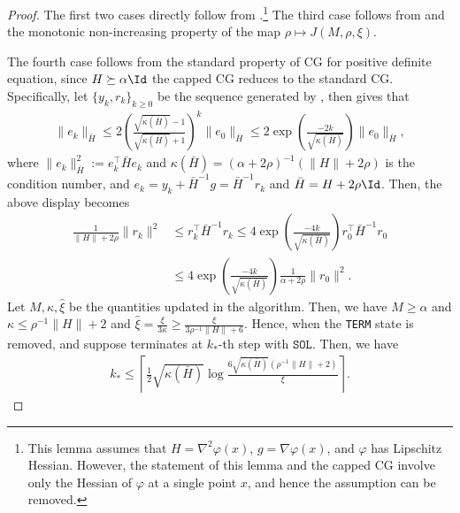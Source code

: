 \begin{proof}
    The first two cases directly follow from \citet[Lemma 3]{royer2020newton}.\footnote{This lemma assumes that $H = \nabla^2 \varphi(x)$, $g = \nabla \varphi(x)$, and $\varphi$ has Lipschitz Hessian. However, the statement of this lemma and the capped CG involve only the Hessian of $\varphi$ at a single point $x$, and hence the assumption can be removed.} 
    The third case follows from  and the 
    monotonic non-increasing property of the map $\rho \mapsto J(M, \rho, \xi)$.

    The fourth case follows from the standard property of CG for positive definite equation,
    since $H \succeq \alpha \Id$ the capped CG reduces to the standard CG. 
    Specifically, let $\{ y_k, r_k \}_{k\ge 0}$ be the sequence generated by , then \citet[Equation (5.36)]{nocedal1999numerical} gives that 
    \begin{align*}
        \| e_k \|_{\bar H}
        \leq 2 \left( \frac{\sqrt{\kappa({\bar H})}-1}{\sqrt{\kappa({\bar H})}+1} \right)^k \|e_0\|_{\bar H}
        \leq 2 \exp\left( \frac{-2k}{\sqrt{\kappa({\bar H})}} \right) \|e_0\|_{\bar H},
    \end{align*}
    where $\|e_k\|_{\bar H}^2 := e_k^\top \bar H e_k$ and $\kappa(\bar H) = (\alpha + 2\rho)^{-1}(\|H\| + 2\rho)$ is the condition number, 
    and $e_k = y_k + \bar H^{-1} g = \bar H^{-1} r_k$ and $\bar H = H + 2\rho \Id$.
    Then, the above display becomes
    \begin{align*}
        \frac{1}{\|H\|+ 2\rho}
        \|r_k\|^2
        &\leq
        r_k^\top  \bar H^{-1} r_k 
        \leq 4 \exp\left( \frac{-4k}{\sqrt{\kappa({\bar H})}} \right) r_0^\top \bar H^{-1}  r_0 \\
        &\leq 
        4 \exp\left( \frac{-4k}{\sqrt{\kappa({\bar H})}} \right)  
        \frac{1}{\alpha + 2\rho}
        \|r_0\|^2.
    \end{align*}
    Let $M, \kappa, \hat \xi$ be the quantities updated in the algorithm. 
    Then, we have $M \geq \alpha$ 
    and $\kappa \leq \rho^{-1}\|H\| + 2$ and $\hat \xi = \frac{\xi}{3\kappa} \geq \frac{\xi}{3\rho^{-1}\|H\| + 6}$.
    Hence, when the \texttt{TERM} state is removed, and suppose  terminates at $k_*$-th step with $\texttt{SOL}$.
    Then, we have
    \begin{align}
        \label{eqn:proof/cg-normal-termination}
        k_* \leq \left \lceil \frac{1}{2} \sqrt{\kappa(\bar H)}
        \log \frac{6\sqrt{\kappa(\bar H)}(\rho^{-1} \|H \| + 2)}{\xi} \right \rceil.

\end{align}
\end{proof}
